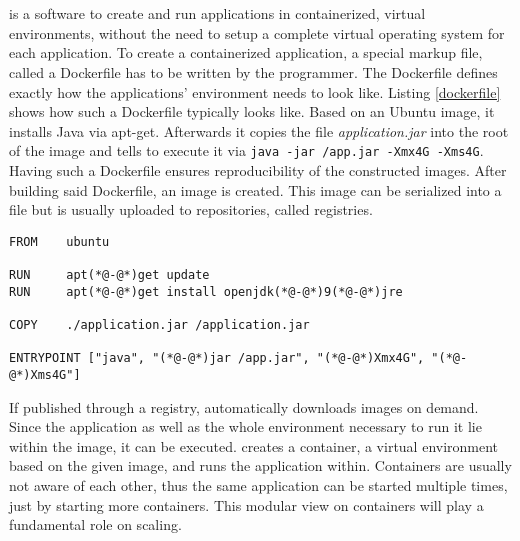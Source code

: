 
\section{\docker{}}
\docker{} is a software to create and run applications in containerized, virtual environments, without the need to setup a complete virtual operating system for each application. 
To create a containerized application, a special markup file, called a Dockerfile has to be written by the programmer. The Dockerfile defines exactly how the applications' environment needs to look like. Listing \ref{dockerfile} shows how such a Dockerfile typically looks like. Based on an Ubuntu image, it installs Java via apt-get. Afterwards it copies the file {\em{} application.jar} into the root of the image and tells \docker{} to execute it via \lstinline[]|java -jar /app.jar -Xmx4G -Xms4G|. Having such a Dockerfile ensures reproducibility of the constructed images. After building said Dockerfile, an image is created. This image can be serialized into a file but is usually uploaded to \docker{} repositories, called registries. 

\begin{minipage}{\textwidth}
	
\begin{lstlisting}[style=YAML,caption=A sample Dockerfile used for creating a simple Ubuntu based image to start a Java application.,label=dockerfile]
FROM	ubuntu

RUN		apt(*@-@*)get update
RUN		apt(*@-@*)get install openjdk(*@-@*)9(*@-@*)jre

COPY	./application.jar /application.jar

ENTRYPOINT ["java", "(*@-@*)jar /app.jar", "(*@-@*)Xmx4G", "(*@-@*)Xms4G"]
\end{lstlisting}

\end{minipage}

If published through a registry, \docker{} automatically downloads images on demand. Since the application as well as the whole environment necessary to run it lie within the image, it can be executed. \docker{} creates a container, a virtual environment based on the given image, and runs the application within. Containers are usually not aware of each other, thus the same application can be started multiple times, just by starting more containers. This modular view on containers will play a fundamental role on scaling.